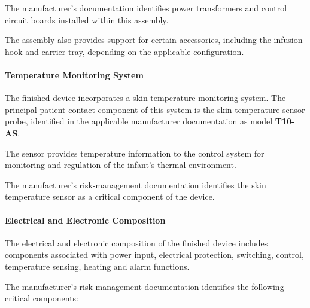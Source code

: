 The manufacturer's documentation identifies power transformers and
control circuit boards installed within this assembly.

The assembly also provides support for certain accessories,
including the infusion hook and carrier tray, depending on the
applicable configuration.


\paragraph{Temperature Monitoring System}

The finished device incorporates a skin temperature monitoring
system. The principal patient-contact component of this system is
the skin temperature sensor probe, identified in the applicable
manufacturer documentation as model \textbf{T10-AS}.

The sensor provides temperature information to the control system
for monitoring and regulation of the infant's thermal environment.

The manufacturer's risk-management documentation identifies the
skin temperature sensor as a critical component of the device.


\paragraph{Electrical and Electronic Composition}

The electrical and electronic composition of the finished device
includes components associated with power input, electrical
protection, switching, control, temperature sensing, heating and
alarm functions.

The manufacturer's risk-management documentation identifies the
following critical components:

